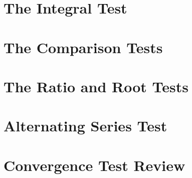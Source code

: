 \documentclass[twoside, addpoints, 12pt, letterpage]{exam}
\begin{document}
\section{The Integral Test}
\cleardoublepage

\section{The Comparison Tests}
\cleardoublepage

\section{The Ratio and Root Tests}
\cleardoublepage

\section{Alternating Series Test}
\cleardoublepage

\section{Convergence Test Review}
\cleardoublepage
\end{document}
